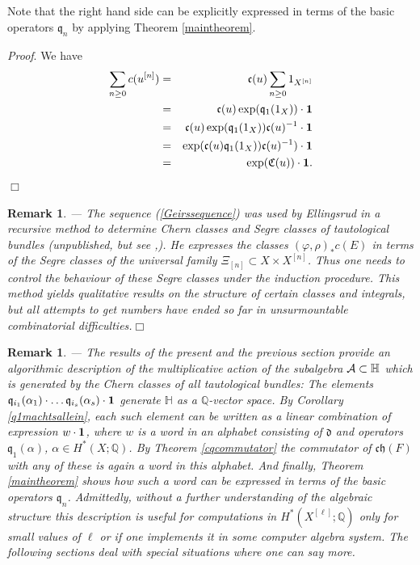 \documentclass[twoside,11pt]{article}
\newtheorem{remark}[theorem]{Remark}
\newcommand{\prf}{{\kursiv Proof}. }
\newcommand{\qed}{\hspace*{\fill}$\Box$\vspace{2ex}}
\newcommand{\kursiv}{\sl}
\newcommand{\ka}{{\cal A}}
\newcommand{\IH}{{\mathbb H}}
\newcommand{\IQ}{{\mathbb Q}}
\newcommand{\gothc}{{\mathfrak c}}
\newcommand{\gothd}{{\mathfrak d}}
\newcommand{\gothh}{{\mathfrak h}}
\newcommand{\gothq}{{\mathfrak q}}
\newcommand{\gothC}{{\mathfrak C}}
\newcommand{\dd}{\gothd}
\newcommand{\qq}{\gothq}
\newcommand{\ch}{{\gothc\gothh}}
\newcommand{\vacuum}{{\bf 1}}
\renewcommand{\phi}{\varphi}
\begin{document}
Note that the right hand side can be explicitly expressed in terms of the basic
operators $\qq_n$ by applying Theorem \ref{maintheorem}.

\prf We have
\begin{eqnarray*}
\sum_{n\geq0}c(u^{[n]})&=&\gothc(u)\sum_{n\geq0}1_{X^{[n]}}\\
&=&\gothc(u)\exp(\qq_1(1_X))\cdot\vacuum\\
&=&\gothc(u)\exp(\qq_1(1_X))\gothc(u)^{-1}\cdot\vacuum\\
&=&\exp(\gothc(u)\qq_1(1_X))\gothc(u)^{-1})\cdot\vacuum\\
&=&\exp(\gothC(u))\cdot\vacuum.
\end{eqnarray*}
\qed




\begin{remark}--- The sequence (\ref{Geirssequence}) was used by Ellingsrud 
in a recursive method to determine Chern classes and Segre classes
of tautological bundles (unpublished, but see \cite{TikhomirovStandardBundles},\cite{EllingsrudGoettscheLehn}). He expresses the classes $(\phi,\rho)_*c(E)$ in terms of the 
Segre classes of the universal family $\Xi_{[n]}\subset X\times X^{[n]}$.
Thus one needs to control the behaviour of these Segre classes under the 
induction procedure. This method yields qualitative results on the {\em
structure} of certain classes and integrals, but all attempts to get numbers
have ended so far in unsurmountable combinatorial difficulties.\qed
\end{remark}
 
\begin{remark}--- The results of the present and the previous section provide
an algorithmic description of the multiplicative action of the subalgebra $\ka\subset\IH$ which is generated by the Chern classes of all tautological bundles:
The elements $\qq_{i_1}(\alpha_1)\cdot\ldots\qq_{i_s}(\alpha_s)\cdot\vacuum$
generate $\IH$ as a $\IQ$-vector space. By Corollary \ref{q1machtsallein}, 
each such
element can be written as a linear combination of expression $w\cdot\vacuum$,
where $w$ is a word in an alphabet consisting of $\dd$ and operators $\qq_1(\alpha)$, $\alpha\in H^*(X;\IQ)$. By Theorem \ref{cqcommutator} 
the commutator of $\ch(F)$ with any of these is again a word in this alphabet.
And finally, Theorem \ref{maintheorem} shows how such a word can be expressed
in terms of the basic operators $\qq_n$. Admittedly, without a further 
understanding of the algebraic structure this description is useful for
computations in $H^*(X^{[\ell]};\IQ)$ only for small values of $\ell$ or if one
implements it in some computer algebra system. The following sections 
deal with special situations where one can say more.
\end{remark}
\end{document}
